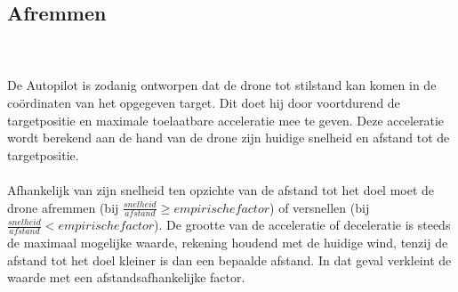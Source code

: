 \subsection{Afremmen}
\\
\\
De Autopilot is zodanig ontworpen dat de drone tot stilstand kan komen in de co\"ordinaten van het opgegeven target. Dit doet hij door voortdurend de targetpositie en maximale toelaatbare acceleratie mee te geven. Deze acceleratie wordt berekend aan de hand van de drone zijn huidige snelheid en afstand tot de targetpositie.
\\
\\
Afhankelijk van zijn snelheid ten opzichte van de afstand tot het doel moet de drone afremmen (bij $\frac{snelheid}{afstand}  \geq empirische factor$) of versnellen (bij $\frac{snelheid}{afstand}  < empirische factor$). De grootte van de acceleratie of deceleratie is steeds de maximaal mogelijke waarde, rekening houdend met de huidige wind, tenzij de afstand tot het doel kleiner is dan een bepaalde afstand. In dat geval verkleint de waarde met een afstandsafhankelijke factor.